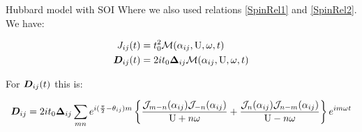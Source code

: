 \begin{section}{Hubbard model with SOI}
Where we also used relations \ref{SpinRel1} and \ref{SpinRel2}. We have:

\begin{align}
J_{ij}(t) &= t_0^2\mathcal{M}(\alpha_{ij}, \text{U}, \omega, t) \\
\boldsymbol{D}_{ij}(t) &= 2it_0\boldsymbol{\Delta}_{ij} \mathcal{M}(\alpha_{ij}, \text{U}, \omega, t)
\end{align}

For $\boldsymbol{D}_{ij}(t)$ this is:

\begin{equation}
\boldsymbol{D}_{ij} = 2it_0 \boldsymbol{\Delta}_{ij} \sum_{mn}e^{i(\frac{\pi}{2}-\theta_{ij})m} \left\{ 
    \frac{\mathcal{J}_{m-n}(\alpha_{ij})\mathcal{J}_{-n}(\alpha_{ij})}{\text{U}+n\omega} +
    \frac{\mathcal{J}_n(\alpha_{ij})\mathcal{J}_{n-m}(\alpha_{ij})}{\text{U}-n\omega}    
    \right\}e^{im\omega t}
\end{equation}

\end{section}

